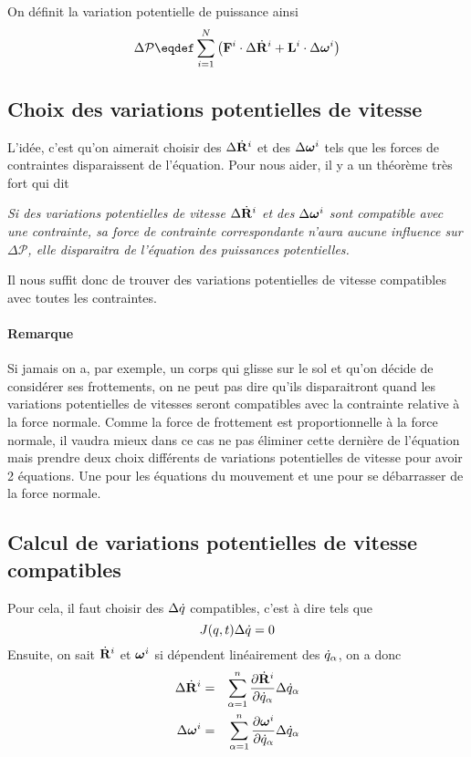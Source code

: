 On définit la variation potentielle de puissance ainsi
\[ \Delta \mathcal{P} \eqdef \sum_{i = 1}^N \left(\fv{F}^i \cdot \Delta \xgd^i + \st^i \cdot \Delta \omegaf^i\right) \]

\subsection{Choix des variations potentielles de vitesse}
L'idée, c'est qu'on aimerait choisir des $\Delta \dot{\bf R}^i$ et des $\Delta {\bm \omega}^i$ tels que les forces de contraintes disparaissent de l'équation.
Pour nous aider, il y a un théorème très fort qui dit
\begin{center}
	{\it
	Si des variations potentielles de vitesse $\Delta \dot{\bf R}^i$ et des $\Delta {\bm \omega}^i$ sont compatible avec une contrainte, sa force de contrainte correspondante n'aura aucune influence sur $\Delta \mathcal{P}$, elle disparaitra de l'équation des puissances potentielles.
	}
\end{center}

Il nous suffit donc de trouver des variations potentielles de vitesse compatibles avec toutes les contraintes.

\paragraph{Remarque}
Si jamais on a, par exemple, un corps qui glisse sur le sol et qu'on décide de considérer ses frottements,
on ne peut pas dire qu'ils disparaitront quand les variations potentielles de vitesses seront compatibles avec la contrainte relative à la force normale.
Comme la force de frottement est proportionnelle à la force normale, il vaudra mieux dans ce cas ne pas éliminer cette dernière de l'équation mais prendre deux choix différents de variations potentielles de vitesse pour avoir 2 équations.
Une pour les équations du mouvement et une pour se débarrasser de la force normale.

\subsection{Calcul de variations potentielles de vitesse compatibles}
Pour cela, il faut choisir des $\Delta \dot{q}$ compatibles, c'est à dire tels que
\[ J(q, t) \Delta \dot{q} = 0 \]
Ensuite, on sait $\dot{\bf R}^i$ et ${\bm \omega}^i$ si dépendent linéairement des $\dot{q}_\alpha$, on a donc
\begin{eqnarray*}
	\Delta \dot{\bf R}^i &=& \sum_{\alpha = 1}^n \frac{\partial \dot{\bf R}^i}{\partial \dot{q}_\alpha} \Delta \dot{q}_\alpha\\
	\Delta {\bm \omega}^i &=& \sum_{\alpha = 1}^n \frac{\partial {\bm \omega}^i}{\partial \dot{q}_\alpha} \Delta \dot{q}_\alpha
\end{eqnarray*}

